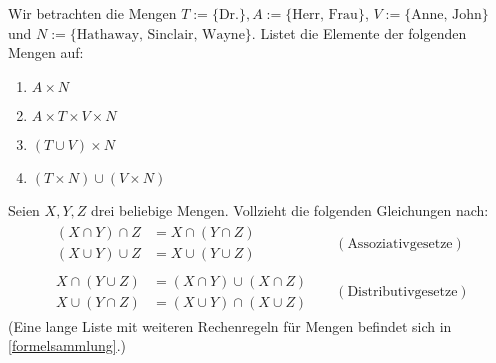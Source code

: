 \begin{aufg}
    Wir betrachten die Mengen $T := \{ \text{Dr.} \}, A := \{ \text{Herr, Frau} \}$, $V:= \{ \text{Anne, John} \}$ und $N := \{ \text{Hathaway, Sinclair, Wayne} \}$. Listet die Elemente der folgenden Mengen auf:
    \begin{enumerate}
	\item $A \times N$
	\item $A\times T \times V\times N$
	\item $(T \cup V) \times N$
	\item $(T\times N)\cup (V\times N)$
    \end{enumerate}
\end{aufg}


\begin{aufg} \label{aufg:capcupgesetze}
    Seien $X,Y,Z$ drei beliebige Mengen. Vollzieht die folgenden Gleichungen nach:
    \begin{align*}
        \begin{split}
            (X \cap Y) \cap Z & = X \cap (Y \cap Z) \\
            (X \cup Y) \cup Z & = X \cup (Y \cup Z)
        \end{split}
        && (\text{Assoziativgesetze}) \\[1em]
        \begin{split}
            X \cap (Y \cup Z) & = (X\cap Y) \cup (X\cap Z) \\
            X \cup (Y\cap Z) & = (X\cup Y) \cap (X\cup Z)
        \end{split}
        && ( \text{Distributivgesetze}) 
    \end{align*}
    (Eine lange Liste mit weiteren Rechenregeln für Mengen befindet sich in \cref{formelsammlung}.)
\end{aufg}

